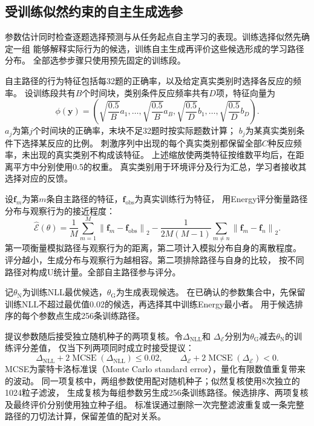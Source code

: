 \documentclass[11pt,a4paper]{article}
\numberwithin{equation}{section}
\newcommand{\norm}[1]{\left\lVert#1\right\rVert}
\begin{document}
\subsection{受训练似然约束的自主生成选参}
\label{sec:selection}
参数估计同时检查逐题选择预测与从任务起点自主学习的表现。训练选择似然先确定一组
能够解释实际行为的候选，训练自主生成再评价这些候选形成的学习路径分布。
全部选参步骤只使用预先固定的训练段。

自主路径的行为特征包括每32题的正确率，以及给定真实类别时选择各反应的频率。
设训练段共有$B$个时间块，类别条件反应频率共有$D$项，特征向量为
\begin{equation}
\phi(\bm y)=\left(\sqrt{\frac{0.5}{B}}a_1,\ldots,
\sqrt{\frac{0.5}{B}}a_B,\sqrt{\frac{0.5}{D}}b_1,\ldots,
\sqrt{\frac{0.5}{D}}b_D\right).
\label{eq:behavior-features}
\end{equation}
$a_j$为第$j$个时间块的正确率，末块不足32题时按实际题数计算；
$b_j$为某真实类别条件下选择某反应的比例。
刺激序列中出现的每个真实类别都保留全部$C$种反应频率，未出现的真实类别不构成该特征。
上述缩放使两类特征按维数平均后，在距离平方中分别使用0.5的权重。
真实类别用于环境评分及行为汇总，学习者接收其选择对应的反馈。

设$\bm f_m$为第$m$条自主路径的特征，$\bm f_{\mathrm{obs}}$为真实训练行为特征，
用Energy评分衡量路径分布与观察行为的接近程度：
\begin{equation}
\widehat{\mathcal E}(\theta)=
\frac1M\sum_{m=1}^M\norm{\bm f_m-\bm f_{\mathrm{obs}}}_2
-\frac{1}{2M(M-1)}\sum_{m\ne n}\norm{\bm f_m-\bm f_n}_2.
\label{eq:energy}
\end{equation}
第一项衡量模拟路径与观察行为的距离，第二项计入模拟分布自身的离散程度。
评分越小，生成分布与观察行为越相容。第二项排除路径与自身的比较，
按不同路径对构成U统计量。全部自主路径参与评分。

记$\theta_{\mathrm N}$为训练NLL最优候选，$\theta_{\mathrm G}$为生成表现候选。
在已确认的参数集合中，先保留训练NLL不超过最优值0.02的候选，再选择其中训练Energy最小者。
用于候选排序的每个参数点生成256条训练路径。

提议参数随后接受独立随机种子的两项复核。令$\Delta_{\mathrm{NLL}}$和
$\Delta_{\mathcal E}$分别为$\theta_{\mathrm G}$减去$\theta_{\mathrm N}$的训练评分差值，
仅当下列两项同时成立时接受提议：
\begin{equation}
\Delta_{\mathrm{NLL}}+2\operatorname{MCSE}(\Delta_{\mathrm{NLL}})\leq0.02,
\qquad
\Delta_{\mathcal E}+2\operatorname{MCSE}(\Delta_{\mathcal E})<0.
\label{eq:selection-guard}
\end{equation}
MCSE为蒙特卡洛标准误（Monte Carlo standard error），量化有限数值重复带来的波动。
同一项复核中，两组参数使用配对随机种子；似然复核使用8次独立的1024粒子滤波，
生成复核为每组参数另生成256条训练路径。候选排序、两项复核及最终评价分别使用独立种子组。
标准误通过删除一次完整滤波重复或一条完整路径的刀切法计算，保留差值的配对关系。
\end{document}
